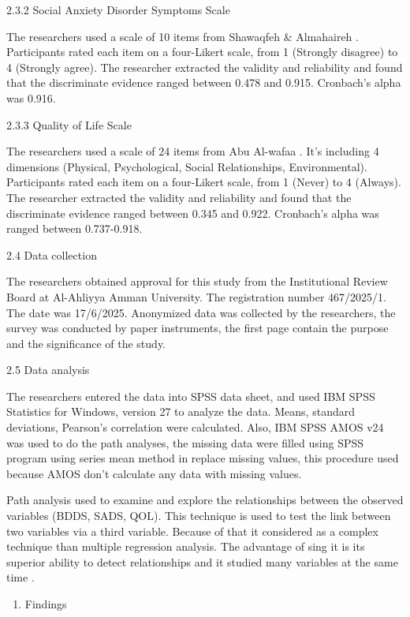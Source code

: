 \documentclass[10pt]{NSP1}
\begin{document}
2.3.2 Social Anxiety Disorder Symptoms Scale

The researchers used a scale of 10 items from Shawaqfeh \& Almahaireh . Participants rated each item on a four-Likert scale, from 1 (Strongly disagree) to 4 (Strongly agree). The researcher extracted the validity and reliability and found that the discriminate evidence ranged between 0.478 and 0.915. Cronbach’s alpha was 0.916.

2.3.3 Quality of Life Scale

The researchers used a scale of 24 items from Abu Al-wafaa . It’s including 4 dimensions (Physical, Psychological, Social Relationships, Environmental). Participants rated each item on a four-Likert scale, from 1 (Never) to 4 (Always). The researcher extracted the validity and reliability and found that the discriminate evidence ranged between 0.345 and 0.922. Cronbach’s alpha was ranged between 0.737-0.918.

2.4 Data collection

The researchers obtained approval for this study from the Institutional Review Board at Al-Ahliyya Amman University. The registration number 467/2025/1. The date was 17/6/2025. Anonymized data was collected by the researchers, the survey was conducted by paper instruments, the first page contain the purpose and the significance of the study.

2.5 Data analysis

The researchers entered the data into SPSS data sheet, and used IBM SPSS Statistics for Windows, version 27 to analyze the data. Means, standard deviations, Pearson’s correlation were calculated. Also, IBM SPSS AMOS v24 was used to do the path analyses, the missing data were filled using SPSS program using series mean method in replace missing values, this procedure used because AMOS don’t calculate any data with missing values.

Path analysis used to examine and explore the relationships between the observed variables (BDDS, SADS, QOL). This technique is used to test the link between two variables via a third variable. Because of that it considered as a complex technique than multiple regression analysis. The advantage of sing it is its superior ability to detect relationships and it studied many variables at the same time .

\begin{enumerate}
  \item Findings
\end{enumerate}
\end{document}
